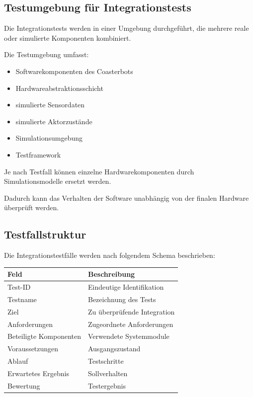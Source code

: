 \documentclass[
  a4paper,
  12pt,
  DIV=12,        %
  parskip=half,  %
  headings=small %
]{scrartcl}
\theoremstyle{definition}
\providecommand{\tightlist}{%
  \setlength{\itemsep}{0pt}\setlength{\parskip}{0pt}}
\theoremstyle{definition}
\begin{document}
\subsection{Testumgebung für
Integrationstests}\label{testumgebung-fuxfcr-integrationstests}

Die Integrationstests werden in einer Umgebung durchgeführt, die mehrere
reale oder simulierte Komponenten kombiniert.

Die Testumgebung umfasst:

\begin{itemize}
\tightlist
\item
  Softwarekomponenten des Coasterbots
\item
  Hardwareabstraktionsschicht
\item
  simulierte Sensordaten
\item
  simulierte Aktorzustände
\item
  Simulationsumgebung
\item
  Testframework
\end{itemize}

Je nach Testfall können einzelne Hardwarekomponenten durch
Simulationsmodelle ersetzt werden.

Dadurch kann das Verhalten der Software unabhängig von der finalen
Hardware überprüft werden.

\subsection{Testfallstruktur}\label{testfallstruktur-1}

Die Integrationstestfälle werden nach folgendem Schema beschrieben:

\begin{longtable}[]{@{}ll@{}}
\toprule\noalign{}
Feld & Beschreibung \\
\midrule\noalign{}
\endhead
\bottomrule\noalign{}
\endlastfoot
Test-ID & Eindeutige Identifikation \\
Testname & Bezeichnung des Tests \\
Ziel & Zu überprüfende Integration \\
Anforderungen & Zugeordnete Anforderungen \\
Beteiligte Komponenten & Verwendete Systemmodule \\
Voraussetzungen & Ausgangszustand \\
Ablauf & Testschritte \\
Erwartetes Ergebnis & Sollverhalten \\
Bewertung & Testergebnis \\
\end{longtable}
\end{document}
